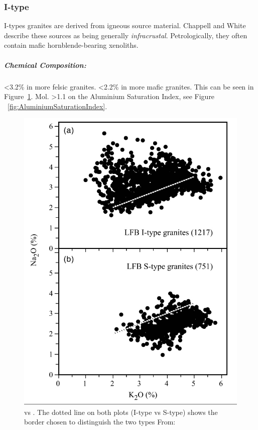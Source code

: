 \documentclass[a4paper]{article}
\begin{document}
\subsubsection{I-type}
I-types granites are derived from igneous source material. Chappell and White describe these sources as being generally \textit{infracrustal}. Petrologically, they often contain mafic hornblende-bearing xenoliths.

\subparagraph{Chemical Composition:}

 \textless 3.2\% in more felsic granites. \newline
{} \textless 2.2\% in more mafic granites. \newline
This can be seen in Figure~\ref{fig:SodiumPotassium}.\newline\newline
Mol.  \textgreater 1.1 on the Aluminium Saturation Index, see Figure  ~\ref{fig:AluminiumSaturationIndex}. 

\begin{figure}[H]
\centering
\includegraphics[width=1\textwidth]{SodiumPotassium.jpg}
\caption{\label{fig:SodiumPotassium}  vs . The dotted line on both plots (I-type vs S-type) shows the border chosen to distinguish the two types  From: \cite{chappell2001two}}
\end{figure}
\end{document}
